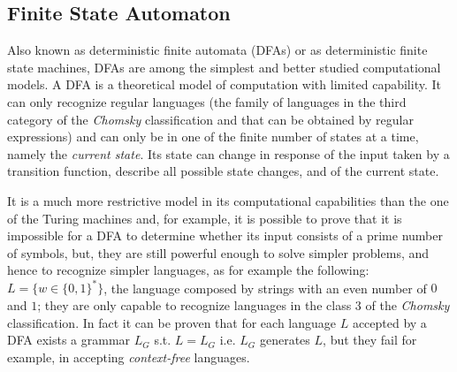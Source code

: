 \subsection{Finite State Automaton}\label{DFA}
Also known as deterministic finite automata (DFAs) or as deterministic finite
state machines, DFAs are among the simplest and better studied computational models.
A DFA is a theoretical model of computation with limited capability. It can only recognize regular languages (the family of languages in the third category of the \textit{Chomsky} classification and that can be obtained by regular expressions) and can only be in one of the finite number of states at a time, namely the \textit{current state}. Its state can change in response of the input taken by a
transition function, describe all possible state changes, and of the current state.
\begin{table}
 \caption{An example of tabular representation of DFM transition function.}
 \label{tab:tabularTransitionFunction}
\end{table} 
It is a much more restrictive model in its computational capabilities than the one of the Turing machines and, for example, it is possible to prove that it is impossible for a DFA to determine whether its input consists of a prime number of symbols, but, they are still powerful enough to solve simpler problems, and hence to recognize
simpler languages, as for example the following: $L=\{w \in \{0,1\}^*\}$, the language composed by strings with an even number of $0$ and $1$; they are only capable to recognize languages in the class $3$ of the \textit{Chomsky} classification\cite{Chomsky:1956}. In fact it can be proven that for each language $L$ accepted by a DFA exists a grammar $L_G$ s.t. $ L=L_G$ i.e. $L_G$ generates $L$,
but they fail for example, in accepting \emph{context-free} languages.

